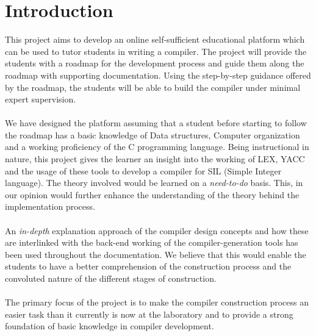 \chapter{Introduction}

This project aims to develop an online self-sufficient educational platform which can be used to tutor students in writing a compiler. The project will provide the students with a roadmap for the development process and guide them along the roadmap with supporting documentation. Using the step-by-step guidance offered by the roadmap, the students will be able to build the compiler under minimal expert supervision.
\\
\\
We have designed the platform assuming that a student before starting to follow the roadmap has a basic knowledge of Data structures, Computer organization and a working proficiency of the C programming language. Being instructional in nature, this project gives the learner an insight into the working of LEX, YACC and the usage of these tools to develop a compiler for SIL (Simple Integer language). The theory involved would be learned on a \textit{need-to-do} basis. This, in our opinion would further enhance the understanding of the theory behind the implementation process.
\\
\\
An \textit{in-depth} explanation approach of the compiler design concepts and how these are interlinked with the back-end working of the compiler-generation tools has been used throughout the documentation. We believe that this would enable the students to have a better comprehension of the construction process and the convoluted nature of the different stages of construction. 
\\
\\
The primary focus of the project is to make the compiler construction process an easier task than it currently is now at the laboratory and to provide a strong foundation of basic knowledge in compiler development.